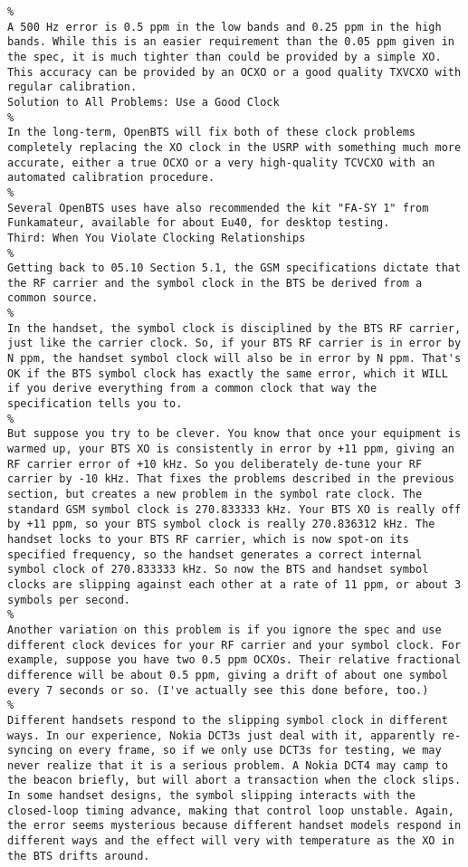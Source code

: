 {\begin{verbatim}
%
A 500 Hz error is 0.5 ppm in the low bands and 0.25 ppm in the high bands. While this is an easier requirement than the 0.05 ppm given in the spec, it is much tighter than could be provided by a simple XO. This accuracy can be provided by an OCXO or a good quality TXVCXO with regular calibration.
Solution to All Problems: Use a Good Clock 
%
In the long-term, OpenBTS will fix both of these clock problems completely replacing the XO clock in the USRP with something much more accurate, either a true OCXO or a very high-quality TCVCXO with an automated calibration procedure.
%
Several OpenBTS uses have also recommended the kit "FA-SY 1" from Funkamateur, available for about Eu40, for desktop testing.
Third: When You Violate Clocking Relationships 
%
Getting back to 05.10 Section 5.1, the GSM specifications dictate that the RF carrier and the symbol clock in the BTS be derived from a common source.
%
In the handset, the symbol clock is disciplined by the BTS RF carrier, just like the carrier clock. So, if your BTS RF carrier is in error by N ppm, the handset symbol clock will also be in error by N ppm. That's OK if the BTS symbol clock has exactly the same error, which it WILL if you derive everything from a common clock that way the specification tells you to.
%
But suppose you try to be clever. You know that once your equipment is warmed up, your BTS XO is consistently in error by +11 ppm, giving an RF carrier error of +10 kHz. So you deliberately de-tune your RF carrier by -10 kHz. That fixes the problems described in the previous section, but creates a new problem in the symbol rate clock. The standard GSM symbol clock is 270.833333 kHz. Your BTS XO is really off by +11 ppm, so your BTS symbol clock is really 270.836312 kHz. The handset locks to your BTS RF carrier, which is now spot-on its specified frequency, so the handset generates a correct internal symbol clock of 270.833333 kHz. So now the BTS and handset symbol clocks are slipping against each other at a rate of 11 ppm, or about 3 symbols per second.
%
Another variation on this problem is if you ignore the spec and use different clock devices for your RF carrier and your symbol clock. For example, suppose you have two 0.5 ppm OCXOs. Their relative fractional difference will be about 0.5 ppm, giving a drift of about one symbol every 7 seconds or so. (I've actually see this done before, too.)
%
Different handsets respond to the slipping symbol clock in different ways. In our experience, Nokia DCT3s just deal with it, apparently re-syncing on every frame, so if we only use DCT3s for testing, we may never realize that it is a serious problem. A Nokia DCT4 may camp to the beacon briefly, but will abort a transaction when the clock slips. In some handset designs, the symbol slipping interacts with the closed-loop timing advance, making that control loop unstable. Again, the error seems mysterious because different handset models respond in different ways and the effect will very with temperature as the XO in the BTS drifts around.
\end{verbatim}
%
\eApplication
}


